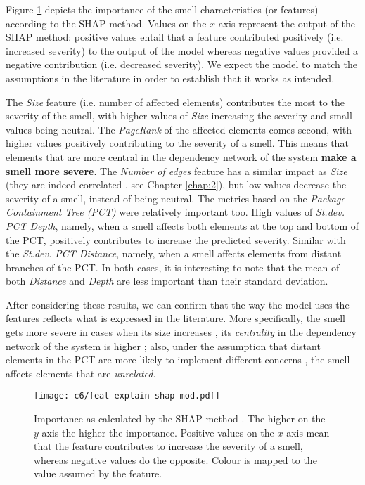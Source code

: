 Figure \ref{c6:fig:feat-explain-shap} depicts the importance of the smell characteristics (or features) according to the SHAP method. Values on the $x$-axis represent the output of the SHAP method: positive values entail that a feature contributed positively (i.e. increased severity) to the output of the model whereas negative values provided a negative contribution (i.e. decreased severity).
We expect the model to match the assumptions in the literature in order to establish that it works as intended.

The \emph{Size} feature (i.e. number of affected elements) contributes the most to the severity of the smell, with higher values of \emph{Size} increasing the severity and small values being neutral.
The \emph{PageRank} of the affected elements comes second, with higher values positively contributing to the severity of a smell.
This means that elements that are more central in the dependency network of the system \textbf{make a smell more severe}.
The \emph{Number of edges} feature has a similar impact as \emph{Size} (they are indeed correlated , see Chapter \ref{chap:2}), but low values decrease the severity of a smell, instead of being neutral.
The metrics based on the \emph{Package Containment Tree (PCT)} \cite{Laval2012,AlMutawa2014} were relatively important too.
High values of \emph{St.dev. PCT Depth}, namely, when a smell affects both elements at the top and bottom of the PCT, positively contributes to increase the predicted severity.
Similar with the \emph{St.dev. PCT Distance}, namely, when a smell affects elements from distant branches of the PCT.
In both cases, it is interesting to note that the mean of both \emph{Distance} and \emph{Depth} are less important than their standard deviation.

After considering these results, we can confirm that the way the model uses the features reflects what is expressed in the literature.
More specifically, the smell gets more severe in cases when its size increases \cite{Lippert2006}, its \emph{centrality} in the dependency network of the system is higher \cite{Roveda2018}; also, under the assumption that distant elements in the PCT are more likely to implement different concerns \cite{Laval2012}, the smell affects elements that are  \emph{unrelated}.

\begin{figure}
    \centering
    \texttt{[image: c6/feat-explain-shap-mod.pdf]}
    \caption{Importance as calculated by the SHAP method \cite{Strumbelj2014}. The higher on the $y$-axis the higher the importance.  Positive values on the $x$-axis mean that the feature contributes to increase the severity of a smell, whereas negative values do the opposite. Colour is mapped to the value assumed by the feature.} 
    \label{c6:fig:feat-explain-shap}
\end{figure}


